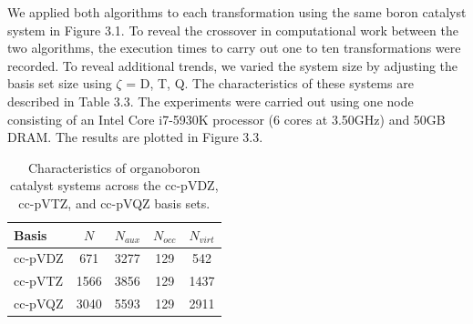 We applied both algorithms to each transformation using the
same boron catalyst system in Figure 3.1. To reveal the crossover in computational work between the two algorithms, 
the execution times to carry out one to ten transformations were recorded. To reveal additional trends, we varied the
system size by adjusting the basis set size using $\zeta$ = D, T, Q. The characteristics of these systems are described in Table 3.3.
The experiments were carried out using one node consisting of an Intel Core i7-5930K processor
(6 cores at 3.50GHz) and 50GB DRAM. The results are plotted in Figure 3.3.
 
\begingroup
\begin{table}[H]
\centering
\renewcommand{\baselinestretch}{1}
\caption{Characteristics of organoboron catalyst systems across the cc-pVDZ, cc-pVTZ, and cc-pVQZ basis sets.}
\begin{tabular}{l cccc}
\multicolumn{1}{l}{\textbf{Basis}} &
\multicolumn{1}{c}{\textbf{$N$}} &
\multicolumn{1}{c}{\textbf{$N_{aux}$}} &
\multicolumn{1}{c}{\textbf{$N_{occ}$}} &
\multicolumn{1}{c}{\textbf{$N_{virt}$}} \\
\hline
cc-pVDZ   & 671  & 3277      & 129       & 542        \\ 
cc-pVTZ   & 1566 & 3856      & 129       & 1437       \\ 
cc-pVQZ   & 3040 & 5593      & 129       & 2911       \\ 
\end{tabular}
\end{table}
\endgroup

